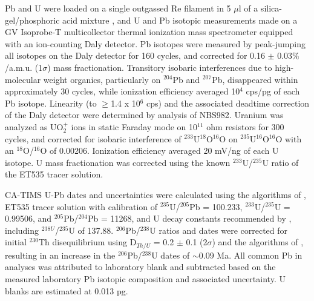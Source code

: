 \documentclass[11pt,letterpaper]{article}
\begin{document}
Pb and U were loaded on a single outgassed Re filament in 5 $\mu$l of a silica-gel/phosphoric acid mixture \citep{Gerstenberger1997a}, and U and Pb isotopic measurements made on a GV Isoprobe-T multicollector thermal ionization mass spectrometer equipped with an ion-counting Daly detector. Pb isotopes were measured by peak-jumping all isotopes on the Daly detector for 160 cycles, and corrected for 0.16 $\pm$ 0.03$\%$/a.m.u. (1$\sigma$) mass fractionation. Transitory isobaric interferences due to high-molecular weight organics, particularly on $^{204}$Pb and $^{207}$Pb, disappeared within approximately 30 cycles, while ionization efficiency averaged 10$^4$ cps/pg of each Pb isotope. Linearity (to $\geq$1.4 x 10$^6$ cps) and the associated deadtime correction of the Daly detector were determined by analysis of NBS982. Uranium was analyzed as UO$_2^+$ ions in static Faraday mode on 10$^{11}$ ohm resistors for 300 cycles, and corrected for isobaric interference of $^{233}$U$^{18}$O$^{16}$O on $^{235}$U$^{16}$O$^{16}$O with an $^{18}$O/$^{16}$O of 0.00206. Ionization efficiency averaged 20 mV/ng of each U isotope. U mass fractionation was corrected using the known $^{233}$U/$^{235}$U ratio of the ET535 tracer solution.

CA-TIMS U-Pb dates and uncertainties were calculated using the algorithms of \cite{Schmitz2007a}, ET535 tracer solution \cite{Condon2015a} with calibration of $^{235}$U/$^{205}$Pb = 100.233, $^{233}$U/$^{235}$U = 0.99506, and $^{205}$Pb/$^{204}$Pb = 11268, and U decay constants recommended by \cite{Jaffey1971a}, including $^{238U}$/$^{235}$U of 137.88. $^{206}$Pb/$^{238}$U ratios and dates were corrected for initial $^{230}$Th disequilibrium using D$_{Th/U}$ = 0.2 $\pm$ 0.1 (2$\sigma$) and the algorithms of \cite{Crowley2007a}, resulting in an increase in the $^{206}$Pb/$^{238}$U dates of $\sim$0.09 Ma. All common Pb in analyses was attributed to laboratory blank and subtracted based on the measured laboratory Pb isotopic composition and associated uncertainty. U blanks are estimated at 0.013 pg.


\end{document}
